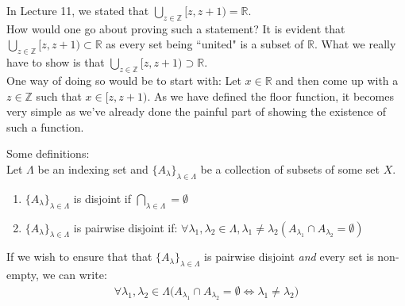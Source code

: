 In Lecture 11, we stated that $\displaystyle\bigcup_{z\in\mathbb{Z}}[z, z+1) = \mathbb{R}$.\\
How would one go about proving such a statement? It is evident that $\displaystyle\bigcup_{z\in\mathbb{Z}}[z, z+1) \subset \mathbb{R}$ as every set being ``united" is a subset of $\mathbb{R}$. What we really have to show is that $\displaystyle\bigcup_{z\in\mathbb{Z}}[z, z+1) \supset \mathbb{R}$.\\
One way of doing so would be to start with: Let $x\in\mathbb{R}$ and then come up with a $z \in \mathbb{Z}$ such that $x \in [z, z+1)$. As we have defined the floor function, it becomes very simple as we've already done the painful part of showing the existence of such a function.

\hrulefill

Some definitions:\\
Let $\Lambda$ be an indexing set and $\{A_\lambda\}_{\lambda\in\Lambda}$ be a collection of subsets of some set $X$.
\begin{enumerate}[nosep]
    \item $\{A_\lambda\}_{\lambda\in\Lambda}$ is disjoint if $\displaystyle\bigcap_{\lambda\in\Lambda} = \emptyset$
    \item $\{A_\lambda\}_{\lambda\in\Lambda}$ is pairwise disjoint if: $\forall \lambda_1, \lambda_2 \in \Lambda, \lambda_1\neq\lambda_2(A_{\lambda_1}\cap A_{\lambda_2} = \emptyset)$
\end{enumerate}
If we wish to ensure that that $\{A_\lambda\}_{\lambda\in\Lambda}$ is pairwise disjoint \textit{and }every set is non-empty, we can write:
\begin{align*}
    \forall \lambda_1, \lambda_2 \in \Lambda\big(A_{\lambda_1}\cap A_{\lambda_2} = \emptyset \iff \lambda_1 \neq \lambda_2\big)
\end{align*}

\hrulefill


\hrulefill

